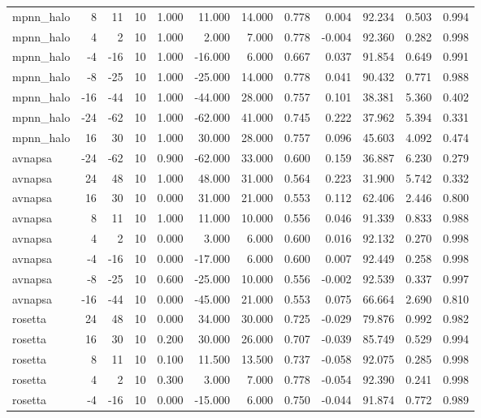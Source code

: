 \begin{table}
\begin{tabular}{lrrrrrrrrrrr}
mpnn\_halo & 8 & 11 & 10 & 1.000 & 11.000 & 14.000 & 0.778 & 0.004 & 92.234 & 0.503 & 0.994 \\
mpnn\_halo & 4 & 2 & 10 & 1.000 & 2.000 & 7.000 & 0.778 & -0.004 & 92.360 & 0.282 & 0.998 \\
mpnn\_halo & -4 & -16 & 10 & 1.000 & -16.000 & 6.000 & 0.667 & 0.037 & 91.854 & 0.649 & 0.991 \\
mpnn\_halo & -8 & -25 & 10 & 1.000 & -25.000 & 14.000 & 0.778 & 0.041 & 90.432 & 0.771 & 0.988 \\
mpnn\_halo & -16 & -44 & 10 & 1.000 & -44.000 & 28.000 & 0.757 & 0.101 & 38.381 & 5.360 & 0.402 \\
mpnn\_halo & -24 & -62 & 10 & 1.000 & -62.000 & 41.000 & 0.745 & 0.222 & 37.962 & 5.394 & 0.331 \\
mpnn\_halo & 16 & 30 & 10 & 1.000 & 30.000 & 28.000 & 0.757 & 0.096 & 45.603 & 4.092 & 0.474 \\
avnapsa & -24 & -62 & 10 & 0.900 & -62.000 & 33.000 & 0.600 & 0.159 & 36.887 & 6.230 & 0.279 \\
avnapsa & 24 & 48 & 10 & 1.000 & 48.000 & 31.000 & 0.564 & 0.223 & 31.900 & 5.742 & 0.332 \\
avnapsa & 16 & 30 & 10 & 0.000 & 31.000 & 21.000 & 0.553 & 0.112 & 62.406 & 2.446 & 0.800 \\
avnapsa & 8 & 11 & 10 & 1.000 & 11.000 & 10.000 & 0.556 & 0.046 & 91.339 & 0.833 & 0.988 \\
avnapsa & 4 & 2 & 10 & 0.000 & 3.000 & 6.000 & 0.600 & 0.016 & 92.132 & 0.270 & 0.998 \\
avnapsa & -4 & -16 & 10 & 0.000 & -17.000 & 6.000 & 0.600 & 0.007 & 92.449 & 0.258 & 0.998 \\
avnapsa & -8 & -25 & 10 & 0.600 & -25.000 & 10.000 & 0.556 & -0.002 & 92.539 & 0.337 & 0.997 \\
avnapsa & -16 & -44 & 10 & 0.000 & -45.000 & 21.000 & 0.553 & 0.075 & 66.664 & 2.690 & 0.810 \\
rosetta & 24 & 48 & 10 & 0.000 & 34.000 & 30.000 & 0.725 & -0.029 & 79.876 & 0.992 & 0.982 \\
rosetta & 16 & 30 & 10 & 0.200 & 30.000 & 26.000 & 0.707 & -0.039 & 85.749 & 0.529 & 0.994 \\
rosetta & 8 & 11 & 10 & 0.100 & 11.500 & 13.500 & 0.737 & -0.058 & 92.075 & 0.285 & 0.998 \\
rosetta & 4 & 2 & 10 & 0.300 & 3.000 & 7.000 & 0.778 & -0.054 & 92.390 & 0.241 & 0.998 \\
rosetta & -4 & -16 & 10 & 0.000 & -15.000 & 6.000 & 0.750 & -0.044 & 91.874 & 0.772 & 0.989 \\

\end{tabular}
\end{table}
